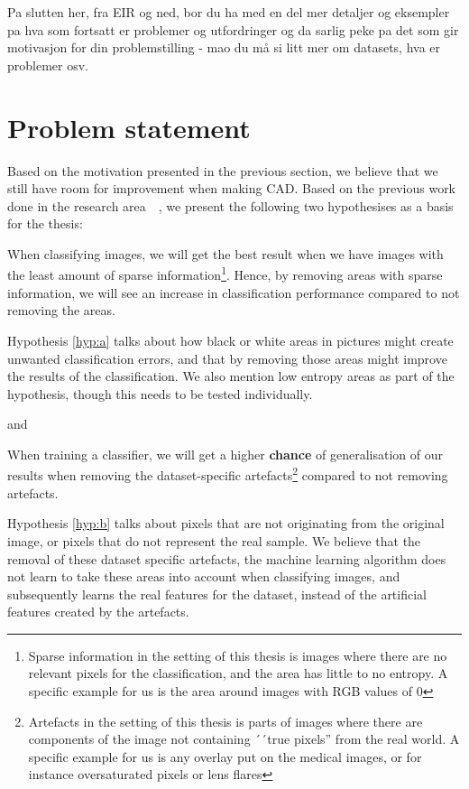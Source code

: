 \vspace{5px}
Pa slutten her, fra EIR og ned, bor du ha med en del mer detaljer og eksempler pa hva som fortsatt er problemer og utfordringer og da sarlig peke pa det som gir motivasjon for din problemstilling - mao du må si litt mer om datasets, hva er problemer osv.
\section{Problem statement}
\label{cha:problemstatement}
Based on the motivation presented in the previous section, we believe that we still have room for improvement when making CAD. Based on the previous work done in the research area~\cite{25956}~\cite{25953}, we present the following two hypothesises as a basis for the thesis:


\noindent
\begin{hyp} \label{hyp:a}
When classifying images, we will get the best result when we have images with the least amount of sparse information\footnote{Sparse information in the setting of this thesis is images where there are no relevant pixels for the classification, and the area has little to no entropy. A specific example for us is the area around images with RGB values of 0}. 
Hence, by removing areas with sparse information,
we will see an increase in classification performance compared to not removing the areas.
\end{hyp}

\noindent
Hypothesis \ref{hyp:a} talks about how black or white areas in pictures might create unwanted classification errors, and that by removing those areas might improve the results of the classification. We also mention low entropy areas as part of the hypothesis, though this needs to be tested individually.

\noindent
and

\noindent 
\begin{hyp} \label{hyp:b}
When training a classifier, we will get a higher \textbf{chance} of generalisation of our results when removing the dataset-specific artefacts\footnote{Artefacts in the setting of this thesis is parts of images where there are components of the image not containing ´´true pixels'' from the real world. A specific example for us is any overlay put on the medical images, or for instance oversaturated pixels or lens flares} compared to not removing artefacts.
\end{hyp}

\noindent
Hypothesis \ref{hyp:b} talks about pixels that are not originating from the original image, or pixels that do not represent the real sample. We believe that the removal of these dataset specific artefacts, the machine learning algorithm does not learn to take these areas into account when classifying images, and subsequently learns the real features for the dataset, instead of the artificial features created by the artefacts.


